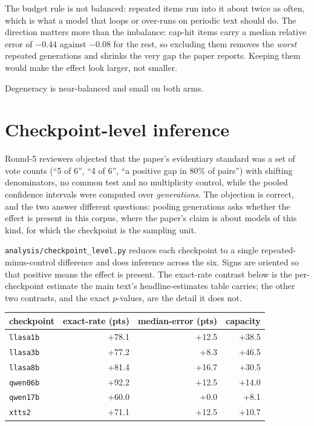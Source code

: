 \documentclass[11pt]{article}
\begin{document}
The budget rule is not balanced: repeated items run into it about twice as
often, which is what a model that loops or over-runs on periodic text should do.
The direction matters more than the imbalance: cap-hit items carry a median
relative error of $-0.44$ against $-0.08$ for the rest, so excluding them removes
the \emph{worst} repeated generations and shrinks the very gap the paper reports.
Keeping them would make the effect look larger, not smaller.

Degeneracy is near-balanced and small on both arms.

\section{Checkpoint-level inference}
\label{sec:s11}

Round-5 reviewers objected that the paper's evidentiary standard was a set of
vote counts (``5 of 6'', ``4 of 6'', ``a positive gap in 80\% of pairs'')
with shifting denominators, no common test and no multiplicity control, while the
pooled confidence intervals were computed over \emph{generations}. The objection
is correct, and the two answer different questions: pooling generations asks
whether the effect is present in this corpus, where the paper's claim is about
models of this kind, for which the checkpoint is the sampling unit.

\texttt{analysis/checkpoint\_level.py} reduces each checkpoint to a single
repeated-minus-control difference and does inference across the six. Signs are
oriented so that positive means the effect is present. The exact-rate contrast
below is the per-checkpoint estimate the main text's headline-estimates table
carries; the other two contrasts, and the exact $p$-values, are the detail it
does not.

\begin{center}
\begin{tabular}{lrrr}
\toprule
checkpoint & exact-rate (pts) & median-error (pts) & capacity \\
\midrule
\texttt{llasa1b} & +78.1 & +12.5 & +38.5 \\
\texttt{llasa3b} & +77.2 & +8.3 & +46.5 \\
\texttt{llasa8b} & +81.4 & +16.7 & +30.5 \\
\texttt{qwen06b} & +92.2 & +12.5 & +14.0 \\
\texttt{qwen17b} & +60.0 & +0.0 & +8.1 \\
\texttt{xtts2} & +71.1 & +12.5 & +10.7 \\
\bottomrule
\end{tabular}
\end{center}
\end{document}
